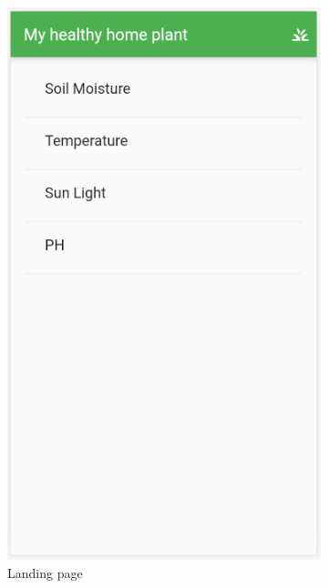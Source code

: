 \begin{figure}
    \centering
    \begin{subfigure}[b]{0.3\columnwidth}
        \centering
        \includegraphics[width=\textwidth]{images/landing.png}
        \caption{Landing page}
    \end{subfigure}
    \begin{subfigure}[b]{0.3\columnwidth}
        \centering

\end{subfigure}
\end{figure}
